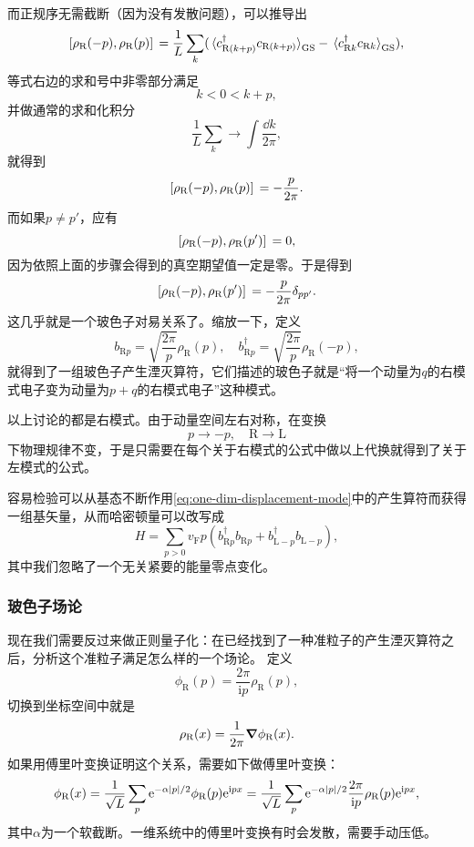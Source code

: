 \documentclass[hyperref, UTF8, a4paper]{ctexart}
\newcommand*{\ii}{\mathrm{i}}
\newcommand*{\ee}{\mathrm{e}}
\begin{document}
而正规序无需截断（因为没有发散问题），可以推导出
\[
    \comm*{{\rho}_\text{R}(- p)}{{\rho}_\text{R}(p)} = \frac{1}{L} \sum_{k} (\expval*{{c}^\dagger_{\text{R} (k + p)} {c}_{\text{R} (k + p)}}_\text{GS} - \expval*{{c}^\dagger_{\text{R} k} {c}_{\text{R} k}}_\text{GS}),
\]
等式右边的求和号中非零部分满足
\[
    k < 0 < k + p,
\]
并做通常的求和化积分
\[
    \frac{1}{L} \sum_k \longrightarrow \int \frac{\dd{k}}{2\pi},
\]
就得到
\[
    \comm*{{\rho}_\text{R}(- p)}{{\rho}_\text{R}(p)} = - \frac{p}{2\pi}.
\]
而如果$p \neq p'$，应有
\[
    \comm*{{\rho}_\text{R}(- p)}{{\rho}_\text{R}(p')} = 0,
\]
因为依照上面的步骤会得到的真空期望值一定是零。于是得到
\begin{equation}
    \comm*{{\rho}_\text{R}(- p)}{{\rho}_\text{R}(p')} = - \frac{p}{2\pi} \delta_{pp'}.
\end{equation}
这几乎就是一个玻色子对易关系了。缩放一下，定义
\begin{equation}
    {b}_{\text{R} p} = \sqrt{\frac{2\pi}{p}} {\rho}_\text{R}(p), \quad {b}^\dagger_{\text{R} p} = \sqrt{\frac{2\pi}{p}} {\rho}_\text{R}(-p),
    \label{eq:one-dim-displacement-mode}
\end{equation}
就得到了一组玻色子产生湮灭算符，它们描述的玻色子就是“将一个动量为$q$的右模式电子变为动量为$p+q$的右模式电子”这种模式。

以上讨论的都是右模式。由于动量空间左右对称，在变换
\[
    p \longrightarrow -p, \quad \text{R} \longrightarrow \text{L}
\]
下物理规律不变，于是只需要在每个关于右模式的公式中做以上代换就得到了关于左模式的公式。

容易检验可以从基态不断作用\eqref{eq:one-dim-displacement-mode}中的产生算符而获得一组基矢量，从而哈密顿量可以改写成
\begin{equation}
    {H} = \sum_{p > 0} v_\text{F} p \left({b}_{\text{R} p}^\dagger {b}_{\text{R} p} + {b}_{\text{L} -p}^\dagger {b}_{\text{L} -p} \right),
    \label{eq:one-dim-displacement-hamiltonian}
\end{equation}
其中我们忽略了一个无关紧要的能量零点变化。

\subsubsection{玻色子场论}

现在我们需要反过来做正则量子化：在已经找到了一种准粒子的产生湮灭算符之后，分析这个准粒子满足怎么样的一个场论。
定义
\begin{equation}
    {\phi}_\text{R}(p) = \frac{2\pi}{\ii p} {\rho}_\text{R}(p),
    \label{eq:one-dim-phi}
\end{equation}
切换到坐标空间中就是
\[
    {\rho}_\text{R}(x) = \frac{1}{2\pi} \grad \phi_\text{R}(x).
\]
如果用傅里叶变换证明这个关系，需要如下做傅里叶变换：
\begin{equation}
    {\phi}_\text{R} (x) = \frac{1}{\sqrt{L}} \sum_p \ee^{- \alpha \abs{p} / 2} \phi_\text{R}(p) \ee^{\ii p x} = \frac{1}{\sqrt{L}} \sum_p \ee^{- \alpha \abs{p} / 2} \frac{2\pi}{\ii p} {\rho}_\text{R}(p) \ee^{\ii p x},
    \label{eq:one-dim-phi-and-rho}
\end{equation}
其中$\alpha$为一个软截断。一维系统中的傅里叶变换有时会发散，需要手动压低。
\end{document}
